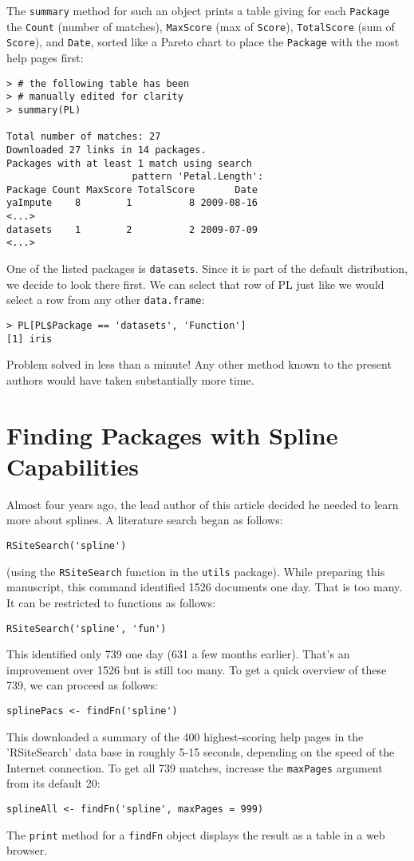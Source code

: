 The {\tt summary} method for such an object prints a table giving
for each {\tt Package} the {\tt Count} (number of matches),
{\tt MaxScore} (max of {\tt Score}), {\tt TotalScore} (sum of
{\tt Score}), and {\tt Date}, sorted like a Pareto chart to place
the {\tt Package} with the most help pages first:
\begin{verbatim}
> # the following table has been
> # manually edited for clarity
> summary(PL)

Total number of matches: 27
Downloaded 27 links in 14 packages.
Packages with at least 1 match using search
                      pattern 'Petal.Length':
Package Count MaxScore TotalScore       Date
yaImpute    8        1          8 2009-08-16
<...>
datasets    1        2          2 2009-07-09
<...>
\end{verbatim}
One of the listed packages is {\tt datasets}.  Since it is part of the
default \R{} distribution, we decide to look there first.  We can
select that row of PL just like we would select a row from any other
{\tt data.frame}:
\begin{verbatim}
> PL[PL$Package == 'datasets', 'Function']
[1] iris
\end{verbatim}
Problem solved in less than a minute!  Any other method known
to the present authors would have taken substantially more time.

\section*{Finding Packages with Spline Capabilities}

Almost four years ago, the lead author of this article decided he
needed to learn more about splines.  A literature search
began as follows:
\begin{verbatim}
RSiteSearch('spline')
\end{verbatim}
(using the {\tt RSiteSearch} function in the {\tt utils} package).
While preparing this manuscript, this command identified
1526 documents one day.  That is too many.  It can be
restricted to functions as follows:
\begin{verbatim}
RSiteSearch('spline', 'fun')
\end{verbatim}
This identified only 739 one day (631 a few months earlier).
That's an improvement over 1526 but is still too many.
To get a quick overview of these 739, we can proceed
as follows:
\begin{verbatim}
splinePacs <- findFn('spline')
\end{verbatim}
This downloaded a summary of the 400 highest-scoring help pages
in the 'RSiteSearch' data base in roughly 5-15 seconds, depending
on the speed of the Internet connection.  To get all 739 matches,
increase the {\tt maxPages} argument from its default 20:
\begin{verbatim}
splineAll <- findFn('spline', maxPages = 999)
\end{verbatim}
The {\tt print} method for a {\tt findFn} object displays the
result as a table in a web browser.

